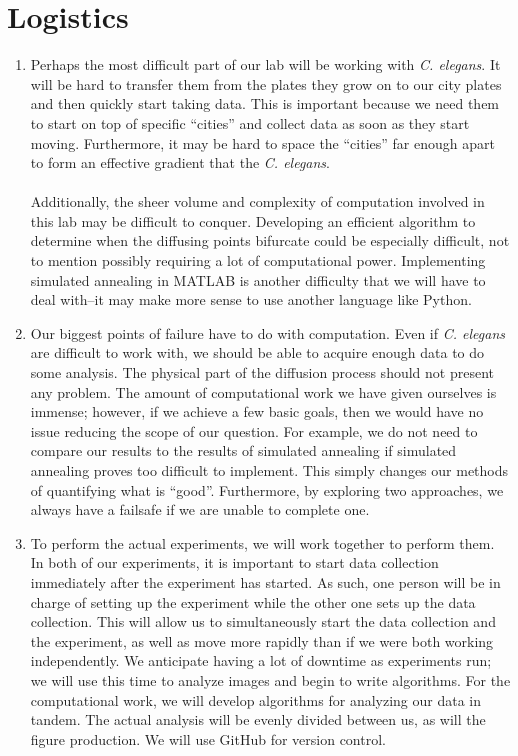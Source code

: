 \section{Logistics}

\begin{enumerate}
\item Perhaps the most difficult part of our lab will be working with \textit{C. elegans}. It will be hard to transfer them from the plates they grow on to our city plates and then quickly start taking data. This is important because we need them to start on top of specific ``cities'' and collect data as soon as they start moving. Furthermore, it may be hard to space the ``cities'' far enough apart to form an effective gradient that the \textit{C. elegans}. \\\\
Additionally, the sheer volume and complexity of computation involved in this lab may be difficult to conquer. Developing an efficient algorithm to determine when the diffusing points bifurcate could be especially difficult, not to mention possibly requiring a lot of computational power. Implementing simulated annealing in MATLAB is another difficulty that we will have to deal with--it may make more sense to use another language like Python. 
\item Our biggest points of failure have to do with computation. Even if \textit{C. elegans} are difficult to work with, we should be able to acquire enough data to do some analysis. The physical part of the diffusion process should not present any problem. The amount of computational work we have given ourselves is immense; however, if we achieve a few basic goals, then we would have no issue reducing the scope of our question. For example, we do not need to compare our results to the results of simulated annealing if simulated annealing proves too difficult to implement. This simply changes our methods of quantifying what is ``good''. Furthermore, by exploring two approaches, we always have a failsafe if we are unable to complete one. 
\item To perform the actual experiments, we will work together to perform them. In both of our experiments, it is important to start data collection immediately after the experiment has started. As such, one person will be in charge of setting up the experiment while the other one sets up the data collection. This will allow us to simultaneously start the data collection and the experiment, as well as move more rapidly than if we were both working independently. We anticipate having a lot of downtime as experiments run; we will use this time to analyze images and begin to write algorithms. For the computational work, we will develop algorithms for analyzing our data in tandem. The actual analysis will be evenly divided between us, as will the figure production. We will use GitHub for version control. 

\end{enumerate}
